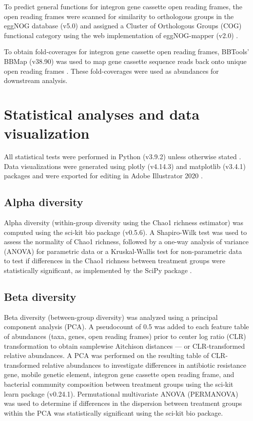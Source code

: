 To predict general functions for integron gene cassette open reading frames, the open reading frames were scanned for similarity to orthologous groups in the eggNOG database (v5.0) and assigned a Cluster of Orthologous Groups (COG) functional category using the web implementation of eggNOG-mapper (v2.0) \parencite{HuertaCepas.2019}.

To obtain fold-coverages for integron gene cassette open reading frames, BBTools’ BBMap (v38.90) was used to map gene cassette sequence reads back onto unique open reading frames \parencite{Bushnell.2016}.
These fold-coverages were used as abundances for downstream analysis.

\section{Statistical analyses and data visualization}

All statistical tests were performed in Python (v3.9.2) unless otherwise stated \parencite{PythonSoftwareFoundation.}.
Data visualizations were generated using plotly (v4.14.3) and matplotlib (v3.4.1) packages and were exported for editing in Adobe Illustrator 2020 \parencite{PlotlyTechnologiesInc..2015, Hunter.2007, AdobeInc..2020}.

\subsection{Alpha diversity}

Alpha diversity (within-group diversity using the Chao1 richness estimator) was computed using the sci-kit bio package (v0.5.6).
A Shapiro-Wilk test was used to assess the normality of Chao1 richness, followed by a one-way analysis of variance (ANOVA) for parametric data or a Kruskal-Wallis test for non-parametric data to test if differences in the Chao1 richness between treatment groups were statistically significant, as implemented by the SciPy package \parencite{PauliVirtanen.2020}.

\subsection{Beta diversity}

Beta diversity (between-group diversity) was analyzed using a principal component analysis (PCA).
A pseudocount of 0.5 was added to each feature table of abundances (taxa, genes, open reading frames) prior to center log ratio (CLR) transformation to obtain samplewise Aitchison distances --- or CLR-transformed relative abundances.
A PCA was performed on the resulting table of CLR-transformed relative abundances to investigate differences in antibiotic resistance gene, mobile genetic element, integron gene cassette open reading frame, and bacterial community composition between treatment groups using the sci-kit learn package (v0.24.1).
Permutational multivariate ANOVA (PERMANOVA) was used to determine if differences in the dispersion between treatment groups within the PCA was statistically significant using the sci-kit bio package.

